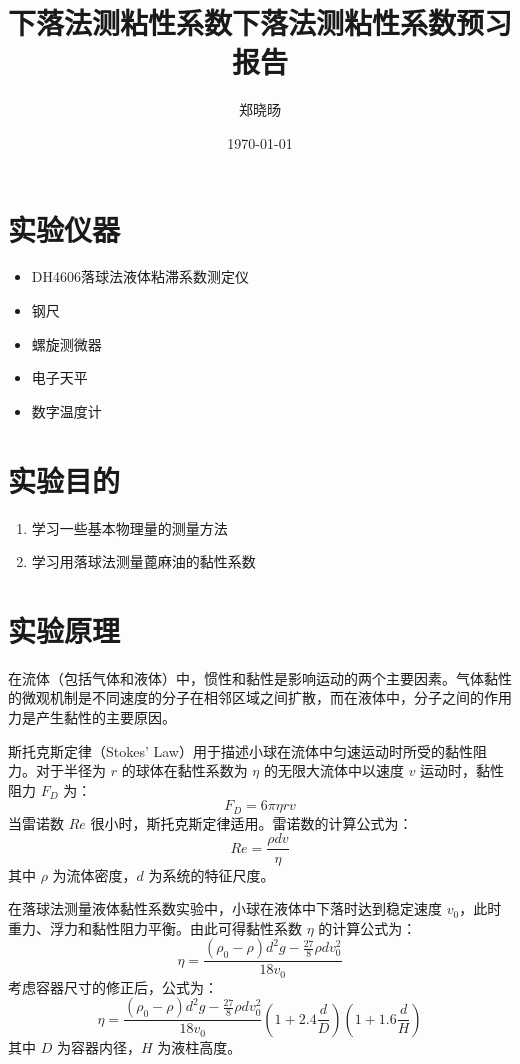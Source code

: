 \documentclass[UTF8]{ctexart}
\title{下落法测粘性系数}
\title{下落法测粘性系数预习报告}
\author{郑晓旸}
\date{\today}
\begin{document}
\fancyfoot[C]{\thepage}

\maketitle
\tableofcontents
\newpage

\section{实验仪器}
\begin{itemize}
    \item DH4606落球法液体粘滞系数测定仪
    \item 钢尺
    \item 螺旋测微器
    \item 电子天平
    \item 数字温度计
\end{itemize}

\section{实验目的}
\begin{enumerate}
    \item 学习一些基本物理量的测量方法
    \item 学习用落球法测量蓖麻油的黏性系数
\end{enumerate}

\section{实验原理}
在流体（包括气体和液体）中，惯性和黏性是影响运动的两个主要因素。气体黏性的微观机制是不同速度的分子在相邻区域之间扩散，而在液体中，分子之间的作用力是产生黏性的主要原因。

斯托克斯定律（Stokes' Law）用于描述小球在流体中匀速运动时所受的黏性阻力。对于半径为 \(r\) 的球体在黏性系数为 \(\eta\) 的无限大流体中以速度 \(v\) 运动时，黏性阻力 \(F_D\) 为：
\[
F_D = 6 \pi \eta r v
\]
当雷诺数 \(Re\) 很小时，斯托克斯定律适用。雷诺数的计算公式为：
\[
Re = \frac{\rho d v}{\eta}
\]
其中 \(\rho\) 为流体密度，\(d\) 为系统的特征尺度。

在落球法测量液体黏性系数实验中，小球在液体中下落时达到稳定速度 \(v_0\)，此时重力、浮力和黏性阻力平衡。由此可得黏性系数 \(\eta\) 的计算公式为：
\[
\eta = \frac{(\rho_0 - \rho) d^2 g - \frac{27}{8} \rho d v_0^2}{18 v_0}
\]
考虑容器尺寸的修正后，公式为：
\[
\eta = \frac{(\rho_0 - \rho) d^2 g - \frac{27}{8} \rho d v_0^2}{18 v_0} \left(1 + 2.4 \frac{d}{D}\right) \left(1 + 1.6 \frac{d}{H}\right)
\]
其中 \(D\) 为容器内径，\(H\) 为液柱高度。
\end{document}
